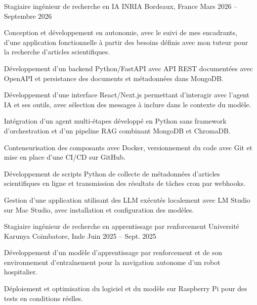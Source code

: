 
\begin{cventries}
  \cventry
    {Stagiaire ingénieur de recherche en IA}
    {INRIA}
    {Bordeaux, France}
    {Mars 2026 -- Septembre 2026}
    {
      \begin{cvitems}
        \item {Conception et développement en autonomie, avec le suivi de mes encadrants, d’une application fonctionnelle à partir des besoins définis avec mon tuteur pour la recherche d’articles scientifiques.}
        \item {Développement d’un backend Python/FastAPI avec API REST documentées avec OpenAPI et persistance des documents et métadonnées dans MongoDB.}
        \item {Développement d’une interface React/Next.js permettant d’interagir avec l’agent IA et ses outils, avec sélection des messages à inclure dans le contexte du modèle.}
        \item {Intégration d’un agent multi-étapes développé en Python sans framework d’orchestration et d’un pipeline RAG combinant MongoDB et ChromaDB.}
        \item {Conteneurisation des composants avec Docker, versionnement du code avec Git et mise en place d’une CI/CD sur GitHub.}
        \item {Développement de scripts Python de collecte de métadonnées d’articles scientifiques en ligne et transmission des résultats de tâches cron par webhooks.}
        \item {Gestion d’une application utilisant des LLM exécutés localement avec LM Studio sur Mac Studio, avec installation et configuration des modèles.}
      \end{cvitems}
    }

  \cventry
    {Stagiaire ingénieur de recherche en apprentissage par renforcement}
    {Université Karunya}
    {Coimbatore, Inde}
    {Juin 2025 -- Sept. 2025}
    {
      \begin{cvitems}
        \item {Développement d’un modèle d’apprentissage par renforcement et de son environnement d’entraînement pour la navigation autonome d’un robot hospitalier.}
        \item {Déploiement et optimisation du logiciel et du modèle sur Raspberry Pi pour des tests en conditions réelles.}
      \end{cvitems}
    }
\end{cventries}
